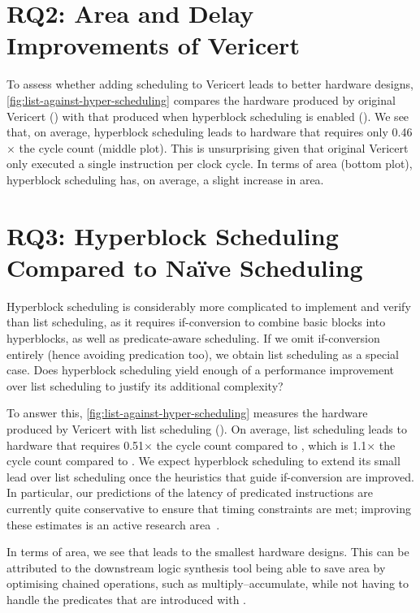 \section{RQ2: Area and Delay Improvements of Vericert}

To assess whether adding scheduling to Vericert leads to better hardware
designs, \cref{fig:list-against-hyper-scheduling} compares the hardware produced
by original Vericert (\VericertBase{}) with that produced when hyperblock
scheduling is enabled (\VericertHyper{}). We see that, on average, hyperblock
scheduling leads to hardware that requires only 0.46$\times$ the cycle count
(middle plot). This is unsurprising given that original Vericert only executed a
single instruction per clock cycle. In terms of area (bottom plot), hyperblock
scheduling has, on average, a slight increase in area.

\section{RQ3: Hyperblock Scheduling Compared to Na\"ive Scheduling}

Hyperblock scheduling is considerably more complicated to implement and verify
than list scheduling, as it requires if-conversion to combine basic blocks into
hyperblocks, as well as predicate-aware scheduling. If we omit if-conversion
entirely (hence avoiding predication too), we obtain list scheduling as a
special case. Does hyperblock scheduling yield enough of a performance
improvement over list scheduling to justify its additional complexity?

To answer this, \cref{fig:list-against-hyper-scheduling} measures the hardware
produced by Vericert with list scheduling (\VericertList{}). On average, list
scheduling leads to hardware that requires 0.51$\times$ the cycle count compared
to \VericertBase{}, which is 1.1$\times$ the cycle count compared to
\VericertHyper{}. We expect hyperblock scheduling to extend its small lead over
list scheduling once the heuristics that guide if-conversion are improved.  In
particular, our predictions of the latency of predicated instructions are
currently quite conservative to ensure that timing constraints are met;
improving these estimates is an active research
area~\cite{tan15_mappin_lut_fpgas,rizzi23_iterat_method_mappin_aware_frequen,wang23_mapbuf,ustun20_accur_fpga_hls,zheng14_fast_effec_placem_routin_direc}.

In terms of area, we see that \VericertList{} leads to the smallest hardware
designs. This can be attributed to the downstream logic synthesis tool being
able to save area by optimising chained operations, such as
multiply--accumulate, while not having to handle the predicates that are
introduced with \VericertHyper{}.


